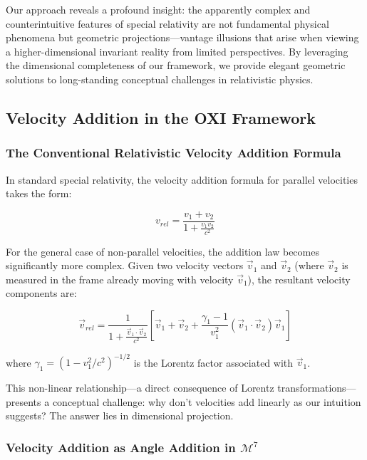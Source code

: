 \documentclass{article}
\begin{document}
Our approach reveals a profound insight: the apparently complex and counterintuitive features of special relativity are not fundamental physical phenomena but geometric projections—vantage illusions that arise when viewing a higher-dimensional invariant reality from limited perspectives. By leveraging the dimensional completeness of our framework, we provide elegant geometric solutions to long-standing conceptual challenges in relativistic physics.

\subsection{Velocity Addition in the OXI Framework}

\subsubsection{The Conventional Relativistic Velocity Addition Formula}

In standard special relativity, the velocity addition formula for parallel velocities takes the form:

\begin{equation}
v_{rel} = \frac{v_1 + v_2}{1 + \frac{v_1 v_2}{c^2}}
\end{equation}

For the general case of non-parallel velocities, the addition law becomes significantly more complex. Given two velocity vectors $\vec{v}_1$ and $\vec{v}_2$ (where $\vec{v}_2$ is measured in the frame already moving with velocity $\vec{v}_1$), the resultant velocity components are:

\begin{equation}
\vec{v}_{rel} = \frac{1}{1 + \frac{\vec{v}_1 \cdot \vec{v}_2}{c^2}} \left[ \vec{v}_1 + \vec{v}_2 + \frac{\gamma_1 - 1}{v_1^2}(\vec{v}_1 \cdot \vec{v}_2)\vec{v}_1 \right]
\end{equation}

where $\gamma_1 = (1-v_1^2/c^2)^{-1/2}$ is the Lorentz factor associated with $\vec{v}_1$.

This non-linear relationship—a direct consequence of Lorentz transformations—presents a conceptual challenge: why don't velocities add linearly as our intuition suggests? The answer lies in dimensional projection.

\subsubsection{Velocity Addition as Angle Addition in $\mathcal{M}^7$}
\end{document}
